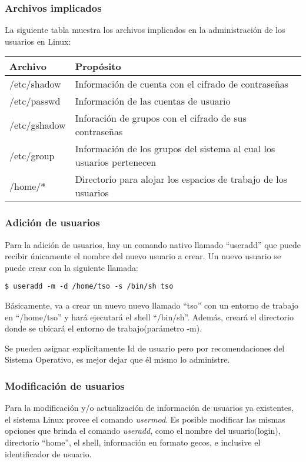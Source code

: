 \documentclass[letterpaper,10pt]{article}
\begin{document}
\subsubsection{Archivos implicados}
La siguiente tabla muestra los archivos implicados en la administración de los usuarios en Linux:\\
\begin{tabularx}{\textwidth}{ll}
Archivo & Propósito \\
\hline
/etc/shadow & Información de cuenta con el cifrado de contraseñas \\
/etc/passwd & Información de las cuentas de usuario \\
/etc/gshadow & Inforación de grupos con el cifrado de sus contraseñas \\
/etc/group & Información de los grupos del sistema al cual los usuarios pertenecen \\
/home/* & Directorio para alojar los espacios de trabajo de los usuarios \\

\end{tabularx}

\subsubsection{Adición de usuarios}
Para la adición de usuarios, hay un comando nativo llamado ``useradd'' que puede recibir únicamente el nombre del nuevo 
usuario a crear. Un nuevo usuario se puede crear con la siguiente llamada:
\begin{verbatim}
$ useradd -m -d /home/tso -s /bin/sh tso 
\end{verbatim}
Básicamente, va a crear un nuevo nuevo llamado ``tso'' con un entorno de trabajo en ``/home/tso'' y hará ejecutará
el shell ``/bin/sh''. Además, creará el directorio donde se ubicará el entorno de trabajo(parámetro -m).

Se pueden asignar explícitamente Id de usuario pero por recomendaciones del Sistema Operativo, es mejor dejar
que él mismo lo administre.


\subsubsection{Modificación de usuarios}
Para la modificación y/o actualización de información de usuarios ya existentes, el sistema Linux provee el comando \emph{usermod}.
Es posible modificar las mismas opciones que brinda el comando \emph{useradd}, como el nombre del usuario(login),
directorio ``home'', el shell, información en formato gecos, e inclusive el identificador de usuario.
\end{document}
